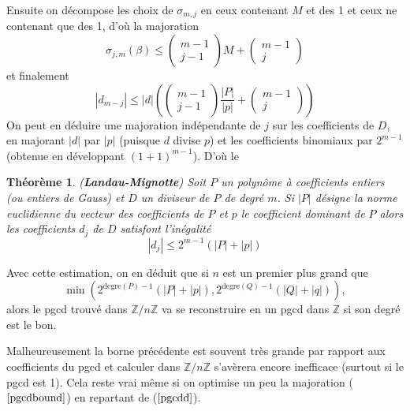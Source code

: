 \documentclass[a4paper,11pt]{book}
\newtheorem{thm}{Théorème}
\begin{document}
\begin{giacjshere}
Ensuite on décompose les choix de $\sigma_{m, j}$ en ceux contenant $M$ et
des 1 et ceux ne contenant que des 1, d'où la majoration
\[ \sigma_{j, m} ( \beta ) \leq \left(\begin{array}{c}
     m - 1\\
     j - 1
   \end{array}\right) M + \left(\begin{array}{c}
     m - 1\\
     j
   \end{array}\right)  \]
et finalement
\begin{equation}
  | d_{m - j} | \leq | d | \left( \left(\begin{array}{c}
    m - 1\\
    j - 1
  \end{array}\right)  \frac{| P |}{| p |} + \left(\begin{array}{c}
    m - 1\\
    j
  \end{array}\right) \right) \label{pgcdd}
\end{equation}
On peut en déduire une majoration indépendante de $j$ sur les coefficients de
$D$, en majorant $| d |$ par $| p |$ (puisque $d$ divise $p$) et les
coefficients binomiaux par $2^{m - 1}$ (obtenue en développant $( 1 + 1 )^{m -
1}$). D'où le

\begin{thm} 
  ({\bf Landau-Mignotte}) 
Soit $P$ un polynôme à coefficients entiers (ou entiers de
  Gauss) et $D$ un diviseur de $P$ de degré $m$. Si $| P |$ désigne la norme
  euclidienne du vecteur des coefficients de $P$ et $p$ le coefficient
  dominant de $P$ alors les coefficients $d_j$ de $D$ satisfont l'inégalité
  \begin{equation}
    | d_j | \leq 2^{m - 1} ( | P | + | p | )
  \end{equation}
\end{thm}

Avec cette estimation, on en déduit que si $n$ est un premier plus grand que
\begin{equation}
  \min \left( 2^{\mbox{degre} ( P ) - 1} ( | P | + | p | ),
  2^{\mbox{degre} ( Q ) - 1} ( | Q | + | q | ) \right), \label{pgcdbound}
\end{equation}
alors le pgcd trouvé dans $\mathbb{Z} / n \mathbb{Z}$ va se reconstruire en un
pgcd dans $\mathbb{Z}$ si son degré est le bon.

Malheureusement la borne précédente est souvent très grande par rapport aux
coefficients du pgcd et calculer dans $\mathbb{Z} / n \mathbb{Z}$ s'avèrera
encore inefficace (surtout si le pgcd est 1). Cela reste vrai même si on
optimise un peu la majoration (\(\ref{pgcdbound}\)) en repartant de 
(\(\ref{pgcdd}\)).


\end{giacjshere}
\end{document}
